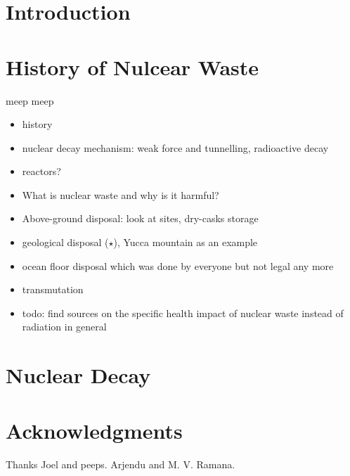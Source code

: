 \documentclass[usenatbib]{article}
\begin{document}
\section{Introduction}

\section{History of Nulcear Waste}
    meep \cite{aa12}
    meep \cite{gc01}
\begin{itemize}
    \item history
    \item nuclear decay mechanism: weak force and tunnelling, radioactive decay
    \item reactors?
    \item What is nuclear waste and why is it harmful?
    \item Above-ground disposal: look at sites, dry-casks storage
    \item geological disposal ($\star$), Yucca mountain as an example
    \item ocean floor disposal which was done by everyone but not legal any more
    \item transmutation
    \item todo: find sources on the specific health impact of nuclear waste instead of radiation
        in general
\end{itemize}
\section{Nuclear Decay}
\section{Acknowledgments}
Thanks Joel and peeps. Arjendu and M. V. Ramana.
\pagebreak
{}


\end{document}
